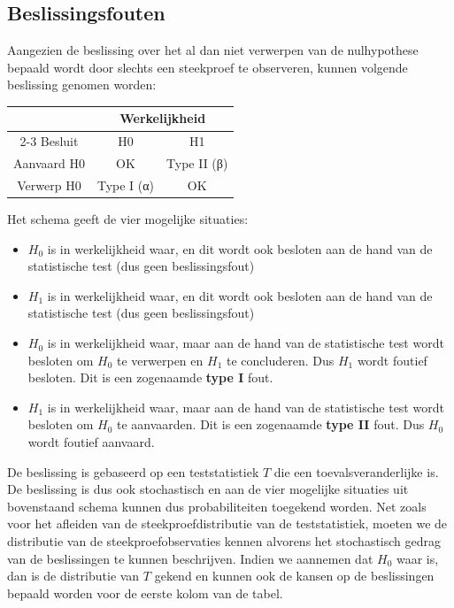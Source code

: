 \documentclass[
  12pt,dutch]{book}
\theoremstyle{definition}
\theoremstyle{definition}
\theoremstyle{definition}
\theoremstyle{definition}
\theoremstyle{remark}
\begin{document}
\subsection{Beslissingsfouten}\label{beslissingsfouten}

Aangezien de beslissing over het al dan niet verwerpen van de nulhypothese bepaald wordt door slechts een steekproef te observeren, kunnen volgende beslissing genomen worden:

\begin{table}
\centering
\begin{tabular}{c|c|c}
\hline
\multicolumn{1}{c|}{ } & \multicolumn{2}{c}{Werkelijkheid} \\
\cline{2-3}
Besluit & H0 & H1\\
\hline
Aanvaard H0 & OK & Type II (β)\\
\hline
Verwerp H0 & Type I (α) & OK\\
\hline
\end{tabular}
\end{table}

Het schema geeft de vier mogelijke situaties:

\begin{itemize}
\item
  \(H_0\) is in werkelijkheid waar, en dit wordt ook besloten aan de hand van de statistische test (dus geen beslissingsfout)
\item
  \(H_1\) is in werkelijkheid waar, en dit wordt ook besloten aan de hand van de statistische test (dus geen beslissingsfout)
\item
  \(H_0\) is in werkelijkheid waar, maar aan de hand van de statistische test wordt besloten om \(H_0\) te verwerpen en \(H_1\) te concluderen. Dus \(H_1\) wordt foutief besloten. Dit is een zogenaamde \textbf{type I} fout.
\item
  \(H_1\) is in werkelijkheid waar, maar aan de hand van de statistische test wordt besloten om \(H_0\) te aanvaarden.
  Dit is een zogenaamde \textbf{type II} fout. Dus \(H_0\) wordt foutief aanvaard.
\end{itemize}

De beslissing is gebaseerd op een teststatistiek \(T\) die een toevalsveranderlijke is. De beslissing is dus ook stochastisch en aan de vier mogelijke situaties uit bovenstaand schema kunnen dus probabiliteiten toegekend worden. Net zoals voor het afleiden van de steekproefdistributie van de teststatistiek, moeten we de distributie van de steekproefobservaties kennen alvorens het stochastisch gedrag van de beslissingen te kunnen beschrijven. Indien we aannemen dat \(H_0\) waar is, dan is de distributie van \(T\) gekend en kunnen ook de kansen op de beslissingen bepaald worden voor de eerste kolom van de tabel.
\end{document}
